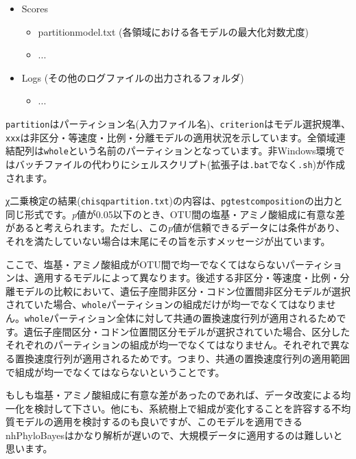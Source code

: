 \documentclass[titlepage,10pt,a4paper]{jsbook}
\begin{document}
\begin{itemize}
\begin{itemize}
\begin{itemize}
\item partition{\textunderscore}criterion{\textunderscore}xxx{\textunderscore}bootstrap.tl (ブートストラップ解析を行うTreefinder Languageスクリプト)
\item ...
\end{itemize}
\item Scores
\begin{itemize}
\item partition{\textunderscore}model.txt (各領域における各モデルの最大化対数尤度)
\item ...
\end{itemize}
\item Logs (その他のログファイルの出力されるフォルダ)
\begin{itemize}
\item ...
\end{itemize}
\end{itemize}
\end{itemize}
\texttt{partition}はパーティション名(入力ファイル名)、\texttt{criterion}はモデル選択規準、\texttt{xxx}は非区分・等速度・比例・分離モデルの適用状況を示しています。全領域連結配列は\texttt{whole}という名前のパーティションとなっています。非Windows環境ではバッチファイルの代わりにシェルスクリプト(拡張子は\texttt{.bat}でなく\texttt{.sh})が作成されます。

χ二乗検定の結果(\texttt{chisq{\textunderscore}partition.txt})の内容は、\texttt{pgtestcomposition}の出力と同じ形式です。\textit{p}値が0.05以下のとき、OTU間の塩基・アミノ酸組成に有意な差があると考えられます。ただし、この\textit{p}値が信頼できるデータには条件があり、それを満たしていない場合は末尾にその旨を示すメッセージが出ています。

ここで、塩基・アミノ酸組成がOTU間で均一でなくてはならないパーティションは、適用するモデルによって異なります。後述する非区分・等速度・比例・分離モデルの比較において、遺伝子座間非区分・コドン位置間非区分モデルが選択されていた場合、\texttt{whole}パーティションの組成だけが均一でなくてはなりません。\texttt{whole}パーティション全体に対して共通の置換速度行列が適用されるためです。遺伝子座間区分・コドン位置間区分モデルが選択されていた場合、区分したそれぞれのパーティションの組成が均一でなくてはなりません。それぞれで異なる置換速度行列が適用されるためです。つまり、共通の置換速度行列の適用範囲で組成が均一でなくてはならないということです。

もしも塩基・アミノ酸組成に有意な差があったのであれば、データ改変による均一化を検討して下さい。他にも、系統樹上で組成が変化することを許容する不均質モデル\citep{Blanquart2006,Blanquart2008}の適用を検討するのも良いですが、このモデルを適用できるnhPhyloBayesはかなり解析が遅いので、大規模データに適用するのは難しいと思います。
\end{document}
